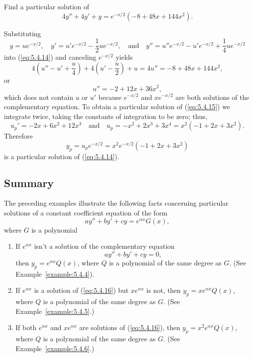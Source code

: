 \documentclass{ximera}
\begin{document}
\begin{example}\label{example:5.4.6}
Find a particular solution of
\begin{equation} \label{eq:5.4.14}
4y''+4y'+y=e^{-x/2}(-8+48x+144x^2).
\end{equation}
 
 
\begin{explanation}  Substituting
$$
y=ue^{-x/2},\quad  y'=u'e^{-x/2}-\frac{1}{2}ue^{-x/2},\quad\mbox{and}\quad y''=u''e^{-x/2}-u'e^{-x/2}+\frac{1}{4}ue^{-x/2}
$$
into (\ref{eq:5.4.14}) and  canceling $e^{-x/2}$  yields
$$
4\left(u''-u'+\frac{u}{4}\right)+4\left(u'-\frac{u}{2}\right)+u=4u''=-8+48x+144x^2,
$$
or
\begin{equation} \label{eq:5.4.15}
u''=-2+12x+36x^2,
\end{equation}
which does not contain $u$ or $u'$ because $e^{-x/2}$ and $xe^{-x/2}$
are both solutions of the complementary equation.
To obtain a particular solution of
(\ref{eq:5.4.15}) we integrate twice, taking the constants of integration
to be zero;   thus,
$$
u_p'=-2x+6x^2+12x^3\quad\mbox{and}\quad
u_p=-x^2+2x^3+3x^4=x^2(-1+2x+3x^2).
$$
Therefore
$$
y_p=u_pe^{-x/2}=x^2e^{-x/2}(-1+2x+3x^2)
$$
is a particular solution of  (\ref{eq:5.4.14}).
\end{explanation}
\end{example}
 
\subsection*{Summary}
 
The preceding examples illustrate the following facts concerning
 particular solutions of a constant coefficient equation of the form
$$
ay''+by'+cy=e^{\alpha x}G(x),
$$
where $G$ is a polynomial
\begin{enumerate}
\item\label{item:partsolutionfactsa} %
If $e^{\alpha x}$ isn't  a solution of the complementary
equation
\begin{equation} \label{eq:5.4.16}
ay''+by'+cy=0,
\end{equation}
then  $y_p=e^{\alpha x}Q(x)$,
 where $Q$ is a polynomial of the same degree as $G$.
(See Example~\ref{example:5.4.4}).
\item\label{item:partsolutionfactsb} %
If $e^{\alpha x}$ is a solution of (\ref{eq:5.4.16}) but $xe^{\alpha x}$
is not, then  $y_p=xe^{\alpha x}Q(x)$,
 where $Q$ is a polynomial of the same degree as $G$.
(See Example~\ref{example:5.4.5}.)
\item\label{item:partsolutionfactsc} %
If both $e^{\alpha x}$ and $xe^{\alpha x}$ are solutions of (\ref{eq:5.4.16}),
then  $y_p=x^2e^{\alpha x}Q(x)$,
 where $Q$ is a polynomial of the same degree as $G$.
(See Example~\ref{example:5.4.6}.)
\end{enumerate}
 
\end{document}
